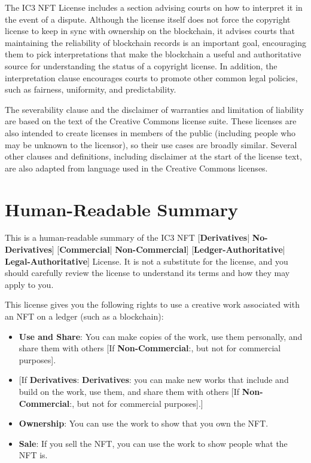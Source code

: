 \documentclass{article}
\newcommand{\iccclicense}{IC3 NFT License\xspace}
\newcommand{\keyword}[1]{\textbf{#1}\xspace}
\newcommand{\commercial}{\keyword{Commercial}}
\newcommand{\noncommercial}{\keyword{Non-Commercial}}
\newcommand{\derivative}{\keyword{Derivatives}}
\newcommand{\noderivative}{\keyword{No-Derivatives}}
\newcommand{\ledger}{\keyword{Ledger-Authoritative}}
\newcommand{\legal}{\keyword{Legal-Authoritative}}
\begin{document}
The \iccclicense includes a section advising courts on how to interpret it in the event of a dispute. Although the license itself does not force the copyright license to keep in sync with ownership on the blockchain, it advises courts that maintaining the reliability of blockchain records is an important goal, encouraging them to pick interpretations that make the blockchain a useful and authoritative source for understanding the status of a copyright license. In addition, the interpretation clause encourages courts to promote other common legal policies, such as fairness, uniformity, and predictability.

The severability clause and the disclaimer of warranties and limitation of liability are based on the text of the Creative Commons license suite. These licenses are also intended to create licenses in members of the public (including people who may be unknown to the licensor), so their use cases are broadly similar. Several other clauses and definitions, including disclaimer at the start of the license text, are also adapted from language used in the Creative Commons licenses.

\appendix

\section{Human-Readable Summary}
\label{sec:human}

This is a human-readable summary of the IC3 NFT [\derivative | \noderivative] [\commercial | \noncommercial] [\ledger | \legal] License. It is not a substitute for the license, and you should carefully review the license to understand its terms and how they may apply to you.

This license gives you the following rights to use a creative work associated with an NFT on a ledger (such as a blockchain): 

\begin{itemize}
\item \textbf{Use and Share}: You can make copies of the work, use them personally, and share them with others [If \noncommercial:, but not for commercial purposes].
\item {[}If \derivative: \textbf{Derivatives}: you can make new works that include and build on the work, use them, and share them with others [If \noncommercial:, but not for commercial purposes].]
\item \textbf{Ownership}: You can use the work to show that you own the NFT.
\item \textbf{Sale}: If you sell the NFT, you can use the work to show people what the NFT is.
\end{itemize}
\end{document}

